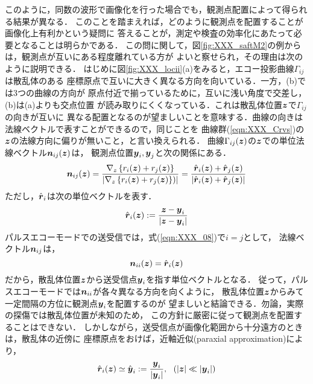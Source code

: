 このように，同数の波形で画像化を行った場合でも，観測点配置によって得られる結果が異なる．
このことを踏まえれば，どのように観測点を配置することが画像化上有利かという疑問に
答えることが，測定や検査の効率化にあたって必要となることは明らかである．
この問に関して，図\ref{fig:XXX_saftM2}の例からは，観測点が互いにある程度離れている方が
よいと察せられ，その理由は次のように説明できる．
はじめに図\ref{fig:XXX_locii}(a)をみると，エコー投影曲線$\Gamma_{ij}$は散乱体のある
座標原点で互いに大きく異なる方向を向いている．一方，(b)では3つの曲線の方向が
原点付近で揃っているために，互いに浅い角度で交差し，(b)は(a)よりも交点位置
が読み取りにくくなっている．これは散乱体位置$\mbox{\boldmath $z$}$で$\Gamma_{ij}$の向きが互いに
異なる配置となるのが望ましいことを意味する．曲線の向きは法線ベクトルで表すことができるので，同じことを
曲線群(\ref{eqn:XXX_Crvs})の$\mbox{\boldmath $z$}$の法線方向に偏りが無いこと，と言い換えられる．
曲線$\Gamma_{ij}(\mbox{\boldmath $z$})$の$\mbox{\boldmath $z$}$での単位法線ベクトル$\mbox{\boldmath $n$}_{ij}(\mbox{\boldmath $z$})$は，
観測点位置$\mbox{\boldmath $y$}_i, \mbox{\boldmath $y$}_j$と次の関係にある．
\begin{equation}
	\mbox{\boldmath $n$}_{ij}(\mbox{\boldmath $z$}) 
	=\frac{\nabla_z \left\{ r_i(\mbox{\boldmath $z$})+r_j(\mbox{\boldmath $z$})\right\}}
	{\left| \nabla_z \left\{r_i(\mbox{\boldmath $z$})+r_j(\mbox{\boldmath $z$})\right\})\right|}
	=\frac{
		\hat{\mbox{\boldmath $r$}}_i(\mbox{\boldmath $z$})+\hat{\mbox{\boldmath $r$}}_j(\mbox{\boldmath $z$})
	}{
		\left| \hat{\mbox{\boldmath $r$}}_i(\mbox{\boldmath $z$})+\hat{\mbox{\boldmath $r$}}_j(\mbox{\boldmath $z$}) \right|
	}
	\label{eqn:XXX_08}
\end{equation}
ただし，$\hat{\mbox{\boldmath $r$}}_i$は次の単位ベクトルを表す．
\begin{equation}
	\hat{\mbox{\boldmath $r$}}_i(\mbox{\boldmath $z$}):=
	\frac{\mbox{\boldmath $z$}-\mbox{\boldmath $y$}_i}
	{\left| \mbox{\boldmath $z$} -\mbox{\boldmath $y$}_i\right|}
	\label{eqn:XXX_ri_hat}
\end{equation}
パルスエコーモードでの送受信では，式(\ref{eqn:XXX_08})で$i=j$として，
法線ベクトル$\mbox{\boldmath $n$}_{ij}$は，
\begin{equation}
	\mbox{\boldmath $n$}_{ii}(\mbox{\boldmath $z$})=\hat{\mbox{\boldmath $r$}}_i(\mbox{\boldmath $z$})
	\label{eqn:normal_pecho}
\end{equation}
だから，散乱体位置$\mbox{\boldmath $z$}$から送受信点$\mbox{\boldmath $y$}_i$を指す単位ベクトルとなる．
従って，パルスエコーモードでは$\mbox{\boldmath $n$}_{ii}$が各々異なる方向を向くように，
散乱体位置$\mbox{\boldmath $z$}$からみて一定間隔の方位に観測点$\mbox{\boldmath $y$}_i$を配置するのが
望ましいと結論できる．勿論，実際の探傷では散乱体位置が未知のため，
この方針に厳密に従って観測点を配置することはできない．
しかしながら，送受信点が画像化範囲から十分遠方のときは，散乱体の近傍に
座標原点をおけば，近軸近似(paraxial approximation)により，
\begin{equation}
	\hat{\mbox{\boldmath $r$}}_i(\mbox{\boldmath $z$}) \simeq \hat{\mbox{\boldmath $y$}}_i:= \frac{\mbox{\boldmath $y$}_i}{|\mbox{\boldmath $y$}_i|}
	, \ \ (|\mbox{\boldmath $z$}|\ll |\mbox{\boldmath $y$}_i|)
	\label{eqn:XXX_09}
\end{equation}

